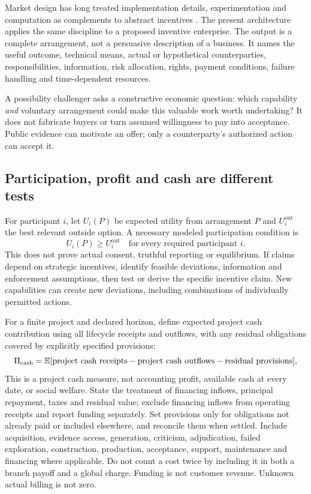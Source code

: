 Market design has long treated implementation details, experimentation and computation as complements to abstract incentives \citep{marketdesign}. The present architecture applies the same discipline to a proposed inventive enterprise. The output is a complete arrangement, not a persuasive description of a business. It names the useful outcome, technical means, actual or hypothetical counterparties, responsibilities, information, risk allocation, rights, payment conditions, failure handling and time-dependent resources.

A possibility challenger asks a constructive economic question: which capability \emph{and} voluntary arrangement could make this valuable work worth undertaking? It does not fabricate buyers or turn assumed willingness to pay into acceptance. Public evidence can motivate an offer; only a counterparty's authorized action can accept it.

\subsection{Participation, profit and cash are different tests}
For participant $i$, let $U_i(P)$ be expected utility from arrangement $P$ and $U_i^{\mathrm{out}}$ the best relevant outside option. A necessary modeled participation condition is
\begin{equation}
U_i(P)\geq U_i^{\mathrm{out}}\quad\text{for every required participant }i.
\end{equation}
This does not prove actual consent, truthful reporting or equilibrium. If claims depend on strategic incentives, identify feasible deviations, information and enforcement assumptions, then test or derive the specific incentive claim. New capabilities can create new deviations, including combinations of individually permitted actions.

For a finite project and declared horizon, define expected project cash contribution using all lifecycle receipts and outflows, with any residual obligations covered by explicitly specified provisions:
\begin{equation}
\Pi_{\mathrm{cash}}=\mathbb{E}[\text{project cash receipts}-\text{project cash outflows}-\text{residual provisions}],
\end{equation}
This is a project cash measure, not accounting profit, available cash at every date, or social welfare. State the treatment of financing inflows, principal repayment, taxes and residual value; exclude financing inflows from operating receipts and report funding separately. Set provisions only for obligations not already paid or included elsewhere, and reconcile them when settled. Include acquisition, evidence access, generation, criticism, adjudication, failed exploration, construction, production, acceptance, support, maintenance and financing where applicable. Do not count a cost twice by including it in both a branch payoff and a global charge. Funding is not customer revenue. Unknown actual billing is not zero.

